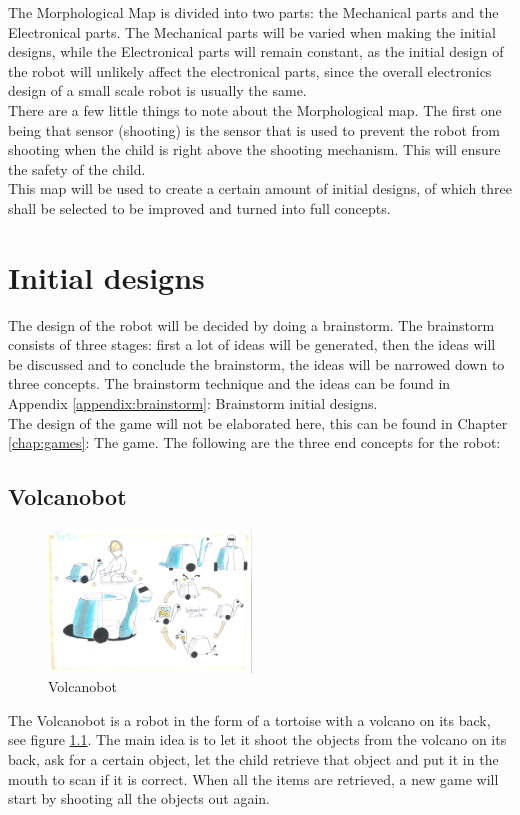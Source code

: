 \documentclass[11pt,twoside,a4paper]{report}
\begin{document}
The Morphological Map is divided into two parts: the Mechanical parts and the Electronical parts. The Mechanical parts will be varied when making the initial designs, while the Electronical parts will remain constant, as the initial design of the robot will unlikely affect the electronical parts, since the overall electronics design of a small scale robot is usually the same. \\
There are a few little things to note about the Morphological map. The first one being that sensor (shooting) is the sensor that is used to prevent the robot from shooting when the child is right above the shooting mechanism. This will ensure the safety of the child. \\
This map will be used to create a certain amount of initial designs, of which three shall be selected to be improved and turned into full concepts.
\label{chap:morphological}

\chapter{Initial designs}
The design of the robot will be decided by doing a brainstorm. The brainstorm consists of three stages: first a lot of ideas will be generated, then the ideas will be discussed and to conclude the brainstorm, the ideas will be narrowed down to three concepts. The brainstorm technique and the ideas can be found in Appendix \ref{appendix:brainstorm}: Brainstorm initial designs. \\
The design of the game will not be elaborated here, this can be found in Chapter \ref{chap:games}: The game. The following are the three end concepts for the robot:

\section{Volcanobot}
\begin{figure}
  \begin{center}
    \includegraphics[width=0.48\textwidth]{Images/VolcanoBotConcept.pdf}
  \end{center}
  \caption{Volcanobot}
  \label{figure:volcanobot}
\end{figure}
The Volcanobot is a robot in the form of a tortoise with a volcano on its back, see figure \ref{figure:volcanobot}. The main idea is to let it shoot the objects from the volcano on its back, ask for a certain object, let the child retrieve that object and put it in the mouth to scan if it is correct. When all the items are retrieved, a new game will start by shooting all the objects out again.
\end{document}
